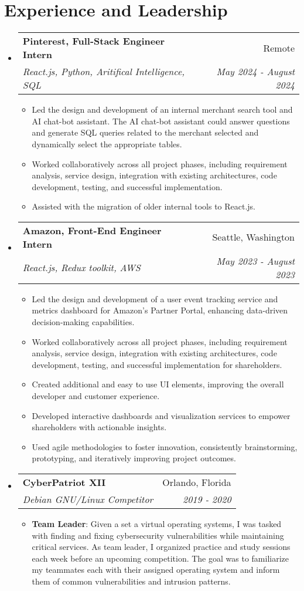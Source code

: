 \documentclass[a4paper,20pt]{article}
\makeatletter
\newcommand{\resumeItem}[2]{
  \item\normalsize{
    \textbf{#1}{: #2 \vspace{1pt}}
  }
}
\newcommand{\resumeSubheading}[4]{
  \vspace{-1pt}\item
    \begin{tabular*}{.97\textwidth}{l@{\extracolsep{\fill}}r}
      \large\textbf{#1} & #2 \\
      \textit{#3} & \textit{#4} \\
    \end{tabular*}\vspace{-5pt}
}
\newcommand{\resumeSubHeadingListStart}{\begin{itemize}[leftmargin=*]}
\newcommand{\resumeSubHeadingListEnd}{\end{itemize}}
\newcommand{\resumeItemListStart}{\begin{itemize}}
\newcommand{\resumeItemListEnd}{\end{itemize}\vspace{-5pt}}
\makeatother
\begin{document}
    
    \section{Experience and Leadership}
        \resumeSubHeadingListStart
            \resumeSubheading{Pinterest, Full-Stack Engineer Intern}{Remote}{React.js, Python, Aritifical Intelligence, SQL}{May 2024 - August 2024}
                \resumeItemListStart
                  \item {Led the design and development of an internal merchant search tool and AI chat-bot assistant. The AI chat-bot assistant could answer questions and generate SQL queries related to the merchant selected and dynamically select the appropriate tables.}
                  \item {Worked collaboratively across all project phases, including requirement analysis, service design, integration with existing architectures, code development, testing, and successful implementation.}
                  \item {Assisted with the migration of older internal tools to React.js.}
                \resumeItemListEnd
            \resumeSubheading{Amazon, Front-End Engineer Intern}{Seattle, Washington}{React.js, Redux toolkit, AWS}{May 2023 - August 2023}
                \resumeItemListStart
                  \item {Led the design and development of a user event tracking service and metrics dashboard for Amazon's Partner Portal, enhancing data-driven decision-making capabilities.}
                  \item {Worked collaboratively across all project phases, including requirement analysis, service design, integration with existing architectures, code development, testing, and successful implementation for shareholders.}
                  \item {Created additional and easy to use UI elements, improving the overall developer and customer experience.}
                  \item {Developed interactive dashboards and visualization services to empower shareholders with actionable insights.}
                  \item {Used agile methodologies to foster innovation, consistently brainstorming, prototyping, and iteratively improving project outcomes.}
                \resumeItemListEnd
            \resumeSubheading{CyberPatriot XII}{Orlando, Florida}{Debian GNU/Linux Competitor}{2019 - 2020}
                \resumeItemListStart
                    \resumeItem{Team Leader}{Given a set a virtual operating systems, I was tasked with finding and fixing cybersecurity vulnerabilities while maintaining critical services. As team leader, I organized practice and study sessions each week before an upcoming competition. The goal was to familiarize my teammates each with their assigned operating system and inform them of common vulnerabilities and intrusion patterns.}
                \resumeItemListEnd
          \resumeSubHeadingListEnd
    
\end{document}
